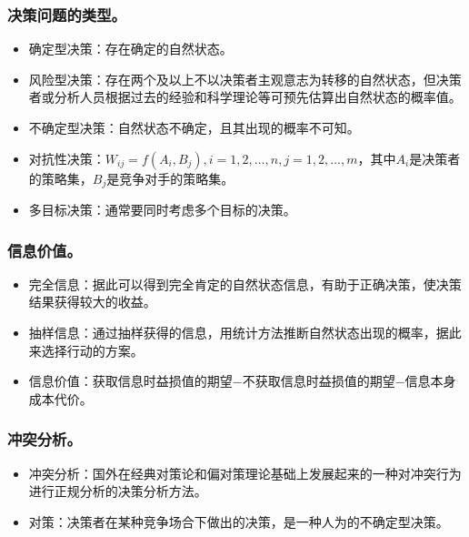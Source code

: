 \documentclass{article}
\begin{document}
\subsubsection{决策问题的类型。}
\begin{itemize}
    \item 确定型决策：存在确定的自然状态。
    \item 风险型决策：存在两个及以上不以决策者主观意志为转移的自然状态，但决策者或分析人员根据过去的经验和科学理论等可预先估算出自然状态的概率值。
    \item 不确定型决策：自然状态不确定，且其出现的概率不可知。
    \item 对抗性决策：$W_{ij}=f(A_i, B_j),i=1,2,\ldots,n, j=1,2,\ldots,m$，其中$A_i$是决策者的策略集，$B_j$是竞争对手的策略集。
    \item 多目标决策：通常要同时考虑多个目标的决策。
\end{itemize}

\subsubsection{信息价值。}
\begin{itemize}
    \item 完全信息：据此可以得到完全肯定的自然状态信息，有助于正确决策，使决策结果获得较大的收益。
    \item 抽样信息：通过抽样获得的信息，用统计方法推断自然状态出现的概率，据此来选择行动的方案。
    \item 信息价值：获取信息时益损值的期望$-$不获取信息时益损值的期望$-$信息本身成本代价。
\end{itemize}

\subsubsection{冲突分析。}
\begin{itemize}
    \item 冲突分析：国外在经典对策论和偏对策理论基础上发展起来的一种对冲突行为进行正规分析的决策分析方法。
    \item 对策：决策者在某种竞争场合下做出的决策，是一种人为的不确定型决策。
\end{itemize}
\end{document}
